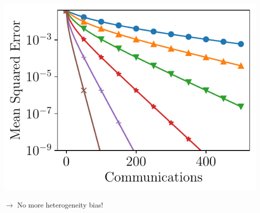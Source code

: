 \documentclass[aspectratio=169,12pt]{beamer}
\begin{document}
\begin{frame}[t]
\begin{minipage}{0.5\linewidth}
  \end{minipage}~~~~~~%
  \begin{minipage}{0.48\linewidth}
  \pause
       \begin{center}
    \includegraphics[width=0.75\linewidth]{images/local_training_homogeneous.pdf}%
  \end{center}
  
    \vspace{-0.5em}

  $\rightarrow$ No more heterogeneity bias!

  \end{minipage}

  \vspace{1.5em}


\end{frame}
\end{document}
